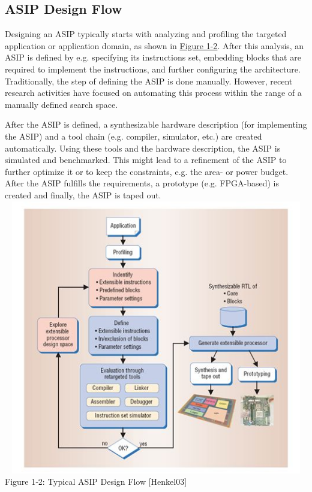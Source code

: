 \documentclass[
]{article}
\begin{document}
\hypertarget{asip-design-flow}{%
\subsection{ASIP Design Flow}\label{asip-design-flow}}

Designing an ASIP typically starts with analyzing and profiling the
targeted application or application domain, as shown in
\protect\hyperlink{Fig12}{Figure 1-2}. After this analysis, an ASIP is
defined by e.g. specifying its instructions set, embedding blocks that
are required to implement the instructions, and further configuring the
architecture. Traditionally, the step of defining the ASIP is done
manually. However, recent research activities have focused on automating
this process within the range of a manually defined search space.

After the ASIP is defined, a synthesizable hardware description (for
implementing the ASIP) and a tool chain (e.g. compiler, simulator, etc.)
are created automatically. Using these tools and the hardware
description, the ASIP is simulated and benchmarked. This might lead to a
refinement of the ASIP to further optimize it or to keep the
constraints, e.g. the area- or power budget. After the ASIP fulfills the
requirements, a prototype (e.g. FPGA-based) is created and finally, the
ASIP is taped out.
\includegraphics[width=5.86597in,height=4.73125in]{1-2.png}
Figure 1‑2: Typical ASIP Design Flow {[}Henkel03{]}
\end{document}
